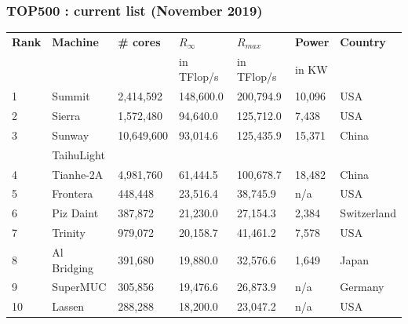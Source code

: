 \begin{frame}[containsverbatim]
\frametitle{TOP500 : current list (November 2019)}
\scriptsize
\begin{tabular}{| l | l | l | l | l | l | l | }
\hline
 \textbf{Rank} & \textbf{Machine} & \textbf{\# cores} & \textbf{$R_{\infty}$} & \textbf{$R_{max}$} & \textbf{Power} & \textbf{Country}\\
               &                  &                   &  in TFlop/s           & in TFlop/s         & in KW & \\
\hline
\hline
1 & Summit & 2,414,592&148,600.0 &200,794.9 & 10,096 & USA\\
\hline
2 & Sierra & 1,572,480 &94,640.0 &125,712.0 & 7,438 & USA\\
\hline
3 & Sunway & 10,649,600 &93,014.6 &125,435.9 &15,371 & China\\
 & TaihuLight &  & & & &\\
\hline
4 & Tianhe-2A & 4,981,760 &61,444.5 & 100,678.7 &18,482 & China\\
\hline
5 & Frontera & 448,448 &23,516.4 &38,745.9 &n/a& USA\\
\hline
6 &  Piz Daint & 387,872 &21,230.0 &27,154.3 &2,384& Switzerland\\
\hline
7 &  Trinity & 979,072 &20,158.7 &41,461.2 &7,578& USA\\
\hline
8 &  Al Bridging & 391,680 &19,880.0 &32,576.6 &1,649& Japan\\
\hline
9 &  SuperMUC & 305,856 &19,476.6 &26,873.9 &n/a& Germany\\
\hline
10 & Lassen & 288,288 &18,200.0 &23,047.2 &n/a& USA\\
\hline

\end{tabular}
\end{frame}




